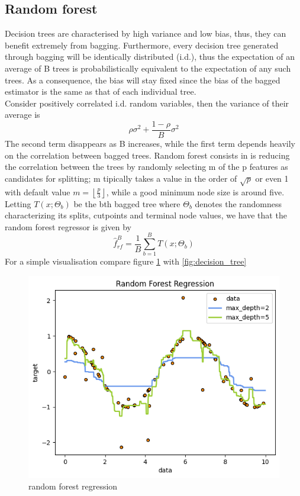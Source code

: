 \subsection{Random forest}
Decision trees are characterised by high variance and low bias, thus, they can benefit extremely from bagging. Furthermore, every decision tree generated through bagging will be identically distributed (i.d.), thus the expectation of an average of B trees is probabilistically equivalent to the expectation of any such trees. As a consequence, the bias will stay fixed since the bias of the bagged estimator is the same as that of each individual tree. 
\\
Consider positively correlated i.d. random variables, then the variance of their average is 
\begin{equation}
    \rho \sigma^2+\frac{1-\rho}{B}\sigma^2
\end{equation}
The second term disappears as B increases, while the first term depends heavily on the correlation between bagged trees. Random forest consists in is reducing the correlation between the trees by randomly selecting m of the p features as candidates for splitting; m tipically takes a value in the order of $\sqrt{p}$ or even 1 with default value $m=\left\lfloor \frac{p}{3} \right\rfloor$, while a good minimum node size is around five. 
\\
Letting $T(x;\Theta_b)$ be the bth bagged tree where $\Theta_b$ denotes the randomness characterizing its splits, cutpoints and terminal node values, we have that the random forest regressor is given by
\begin{equation}
    \hat{f}_{rf}^{B}=\frac{1}{B}\sum\limits_{b=1}^{B}T(x;\Theta_b)
\end{equation}
For a simple visualisation compare figure \ref{fig:random_forest} with \ref{fig:decision_tree}
\begin{figure}
    \includegraphics[width=\textwidth]{images/random_forest.png}
    \caption{random forest regression}
    \label{fig:random_forest}
\end{figure}


